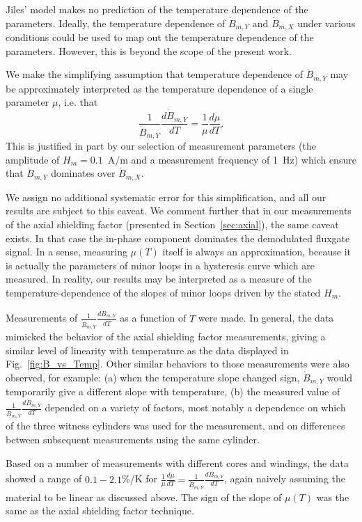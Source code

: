 Jiles' model makes no prediction of the temperature dependence of the
parameters.  Ideally, the temperature dependence of $\dot{B}_{m,Y}$
and $\dot{B}_{m,X}$ under various conditions could be used to map out
the temperature dependence of the parameters.  However, this is beyond
the scope of the present work.

We make the simplifying assumption that temperature dependence of
$\dot{B}_{m,Y}$ may be approximately interpreted as the temperature
dependence of a single parameter $\mu$, i.e. that
\begin{equation}
\frac{1}{\dot{B}_{m,Y}}\frac{d\dot{B}_{m,Y}}{dT}=\frac{1}{\mu}\frac{d\mu}{dT}.
\end{equation}
This is justified in part by our selection of measurement parameters
(the amplitude of $H_m=0.1$~A/m and a measurement frequency of 1~Hz)
which ensure that $\dot{B}_{m,Y}$ dominates over $\dot{B}_{m,X}$.

We assign no additional systematic error for this simplification, and
all our results are subject to this caveat.  We comment further that
in our measurements of the axial shielding factor (presented in
Section~\ref{sec:axial}), the same caveat exists.  In that case the
in-phase component dominates the demodulated fluxgate signal.  In a
sense, measuring $\mu(T)$ itself is always an approximation, because
it is actually the parameters of minor loops in a hysteresis curve
which are measured.  In reality, our results may be interpreted as a
measure of the temperature-dependence of the slopes of minor loops
driven by the stated $H_m$.

Measurements of $\frac{1}{\dot{B}_{m,Y}}\frac{d\dot{B}_{m,Y}}{dT}$ as
a function of $T$ were made.  In general, the data mimicked the
behavior of the axial shielding factor measurements, giving a similar
level of linearity with temperature as the data displayed in
Fig.~\ref{fig:B_vs_Temp}.  Other similar behaviors to those
measurements were also observed, for example: (a) when the temperature
slope changed sign, $\dot{B}_{m,Y}$ would temporarily give a different
slope with temperature, (b) the measured value of
$\frac{1}{\dot{B}_{m,Y}}\frac{d\dot{B}_{m,Y}}{dT}$ depended on a
variety of factors, most notably a dependence on which of the three
witness cylinders was used for the measurement, and on differences
between subsequent measurements using the same cylinder.

Based on a number of measurements with different cores and windings,
the data showed a range of $0.1-2.1$\%/K for
$\frac{1}{\mu}\frac{d\mu}{dT}=\frac{1}{\dot{B}_{m,Y}}\frac{d\dot{B}_{m,Y}}{dT}$,
again naively assuming the material to be linear as discussed above.
The sign of the slope of $\mu(T)$ was the same as the axial shielding
factor technique.

